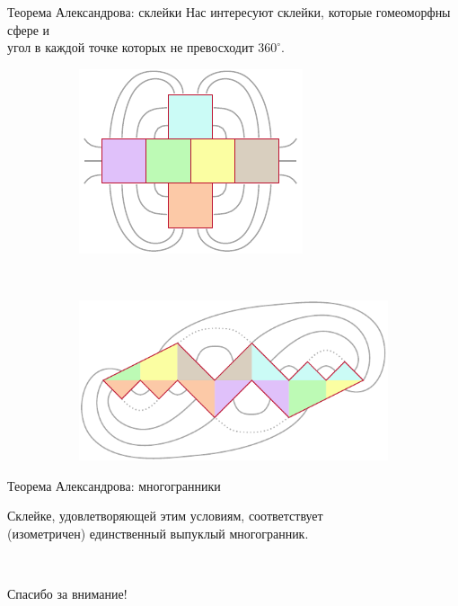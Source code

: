 \documentclass[12pt,aspectratio=169,svgnames]{beamer}
\begin{document}
\begin{frame}{Теорема Александрова: склейки}
	Нас интересуют склейки, которые гомеоморфны сфере и\\
	угол в каждой точке которых не превосходит \(360^\circ\).
\begin{figure}
	\centering
	\begin{subfigure}[m]{0.41\textwidth}
		\centering
		\includegraphics[scale=1.12]{figs_pres/alex_example_1}
	\end{subfigure}
~
	\centering
	\begin{subfigure}[m]{0.48\textwidth}
		\centering
		\includegraphics[scale=0.81]{figs_pres/alex_example_stefan_1}
	\end{subfigure}
\end{figure}
\end{frame}


\begin{frame}{Теорема Александрова: многогранники} \ \\
\begin{thm}
	Склейке, удовлетворяющей этим условиям, соответствует\\
	(изометричен) единственный выпуклый многогранник.
\end{thm} \medskip
\begin{figure}
	\centering
	\begin{subfigure}[m]{0.38\textwidth}
		\centering
		
	\end{subfigure}
~
	\centering
	\begin{subfigure}[m]{0.38\textwidth}
		\centering
		
	\end{subfigure}
\end{figure}
\end{frame}


\begin{frame}{Спасибо за внимание!}
	\tableofcontents
\end{frame}
\end{document}
